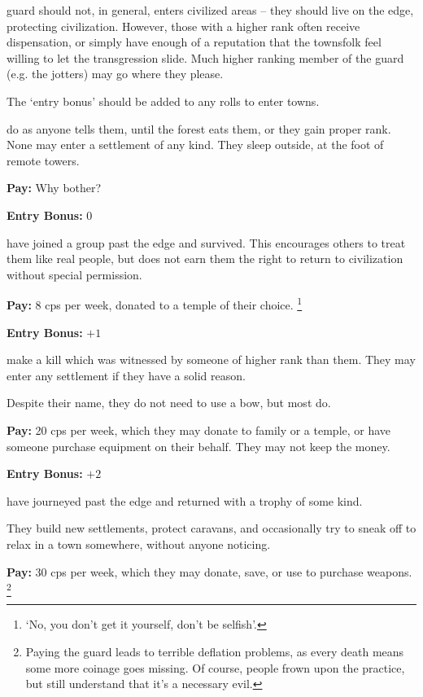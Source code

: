 \begin{multicols}{2}
\Gls{guard} should not, in general, enters civilized areas -- they should live on the \gls{edge}, protecting civilization.
However, those with a higher rank often receive dispensation, or simply have enough of a reputation that the townsfolk feel willing to let the transgression slide.
Much higher ranking member of the \gls{guard} (e.g. the \glspl{jotter}) may go where they please.

The `entry bonus' should be added to any rolls to enter towns.

\begin{description}
  \label{fodder}%
  do as anyone tells them, until the forest eats them, or they gain proper rank.
  None may enter a settlement of any kind.
  They sleep outside, at the foot of remote towers.

  \textbf{Pay:} Why bother?

  \textbf{Entry Bonus:} $0$

  have joined a group past the \gls{edge} and survived.
  This encourages others to treat them like real people, but does not earn them the right to return to civilization without special permission.

  \textbf{Pay:} 8 \glspl{cp} per week, donated to a temple of their choice.%
  \footnote{`No, you don't get it yourself, don't be selfish'.}

  \textbf{Entry Bonus:} $+1$

  make a kill which was witnessed by someone of higher rank than them.
  They may enter any settlement if they have a solid reason.

  Despite their name, they do not need to use a bow, but most do.

  \textbf{Pay:} 20 \glspl{cp} per week, which they may donate to family or a temple, or have someone purchase equipment on their behalf.
  They may not keep the money.

  \textbf{Entry Bonus:} $+2$

  have journeyed past the \gls{edge} and returned with a trophy of some kind.

  They build new settlements, protect caravans, and occasionally try to sneak off to relax in a town somewhere, without anyone noticing.

  \textbf{Pay:} 30 \glspl{cp} per week, which they may donate, save, or use to purchase weapons.%
  \footnote{Paying the \gls{guard} leads to terrible deflation problems, as every death means some more coinage goes missing.
  Of course, people frown upon the practice, but still understand that it's a necessary evil.}


\end{description}
\end{multicols}
